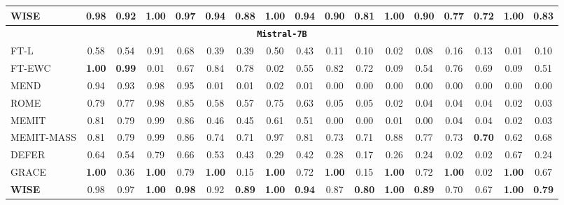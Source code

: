 \begin{table}[t]
{\begin{tabular}{lccc|c|ccc|c|ccc|c|ccc|c}
     \midrule
     \rowcolor{blue!8}\textbf{WISE} & 0.98 & 0.92 & \textbf{1.00} & \textbf{0.97} & 0.94 & \textbf{0.88} & \textbf{1.00} & \textbf{0.94} & 0.90 & \textbf{0.81} & \textbf{1.00} & \textbf{0.90} & 0.77 & \textbf{0.72} & \textbf{1.00} & \textbf{0.83} \\
     \midrule
     \multicolumn{17}{c}{\texttt{\textbf{Mistral-7B}}} \\
     \midrule
     FT-L & 0.58 & 0.54 & 0.91 & 0.68 & 0.39 & 0.39 & 0.50 & 0.43 & 0.11 & 0.10 & 0.02 & 0.08 & 0.16 & 0.13 & 0.01 & 0.10 \\
     FT-EWC & \textbf{1.00} & \textbf{0.99} & 0.01 & 0.67 & 0.84 & 0.78 & 0.02 & 0.55 & 0.82 & 0.72 & 0.09 & 0.54 & 0.76 & 0.69 & 0.09 & 0.51 \\
     MEND & 0.94 & 0.93 & 0.98 & 0.95 & 0.01 & 0.01 & 0.02 & 0.01 & 0.00 & 0.00 & 0.00 & 0.00 & 0.00 & 0.00 & 0.00 & 0.00 \\
     ROME & 0.79 & 0.77 & 0.98 & 0.85 & 0.58 & 0.57 & 0.75 & 0.63 & 0.05 & 0.05 & 0.02 & 0.04 & 0.04 & 0.04 & 0.02 & 0.03 \\
     MEMIT & 0.81 & 0.79 & 0.99 & 0.86 & 0.46 & 0.45 & 0.61 & 0.51 & 0.00 & 0.00 & 0.01 & 0.00 & 0.04 & 0.04 & 0.02 & 0.03 \\
     MEMIT-MASS & 0.81 & 0.79 & 0.99 & 0.86 & 0.74 & 0.71 & 0.97 & 0.81 & 0.73 & 0.71 & 0.88 & 0.77 & 0.73 & \textbf{0.70} & 0.62 & 0.68 \\
     DEFER & 0.64 & 0.54 & 0.79 & 0.66 & 0.53 & 0.43 & 0.29 & 0.42 & 0.28 & 0.17 & 0.26 & 0.24 & 0.02 & 0.02 & 0.67 & 0.24 \\
     GRACE & \textbf{1.00} & 0.36 & \textbf{1.00} & 0.79 & \textbf{1.00} & 0.15 & \textbf{1.00} & 0.72 & \textbf{1.00} & 0.15 & \textbf{1.00} & 0.72 & \textbf{1.00} & 0.02 & \textbf{1.00} & 0.67 \\
     \midrule
     \rowcolor{blue!8}\textbf{WISE} & 0.98 & 0.97 & \textbf{1.00} & \textbf{0.98} & 0.92 & \textbf{0.89} & \textbf{1.00} & \textbf{0.94} & 0.87 & \textbf{0.80} & \textbf{1.00} & \textbf{0.89} & 0.70 & 0.67 & \textbf{1.00} & \textbf{0.79} \\
        \bottomrule 
    \end{tabular}
    }
    \label{tab:zsre_main_editing}
    \vspace{-0.4cm}
\end{table}



